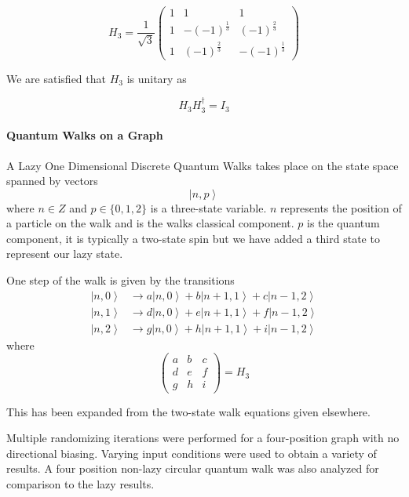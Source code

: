 \documentclass[a0,portrait]{a0poster}
\newcommand{\ket}[1]{\left| #1\right\rangle}
\begin{document}
\begin{center}
{\begin{equation}
H_3 = \dfrac{1}{\sqrt{3}} \begin{pmatrix}
  1 & 1 & 1 \\
  1 & -(-1)^{\frac{1}{3}} & (-1)^{\frac{2}{3}} \\
  1 & (-1)^{\frac{2}{3}} & -(-1)^{\frac{1}{3}}
\end{pmatrix}
\label{eq:5}
\end{equation}

We are satisfied that $H_3$ is unitary as 

\begin{equation}
H_{3}H_{3}^{\dagger} = I_3
\label{eq:6}
\end{equation}

\paragraph{Quantum Walks on a Graph}

A Lazy One Dimensional Discrete Quantum Walks takes place 
on the state space spanned by vectors
\begin{equation}
\ket{n,p}
\label{eq:7}
\end{equation}
where $n\in Z$
and $p\in \{0,1,2\}$ is a three-state variable. $n$ represents the position of a particle on the walk and is the walks classical component. $p$ is the quantum component, it is typically a two-state spin but we have added a third state to represent our lazy state. 

One step of the walk is given by the transitions
\begin{eqnarray}
\ket{n,0} &\longrightarrow a\ket{n,0} + b\ket{n+1,1} + c\ket{n-1,2}\\
\ket{n,1} &\longrightarrow d\ket{n,0} + e\ket{n+1,1} + f\ket{n-1,2}\\
\ket{n,2} &\longrightarrow g\ket{n,0} + h\ket{n+1,1} + i\ket{n-1,2}
\end{eqnarray} 
where 
\begin{equation}
\begin{pmatrix}
  a & b & c \\
  d & e & f \\
  g & h & i 
\end{pmatrix} = H_3
\end{equation}

This has been expanded from the two-state walk equations given elsewhere\cite{Ke:2003,Mc:2010}.

Multiple randomizing iterations were performed for a four-position graph with no directional biasing.   Varying input conditions were used to obtain a variety of results. A four position non-lazy circular quantum walk was also analyzed for comparison to the lazy results.
}
\col{
}
\end{center}
\end{document}
